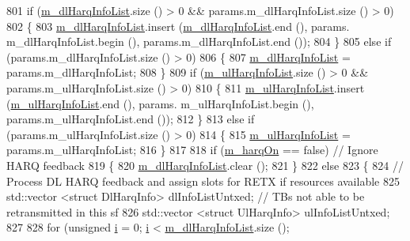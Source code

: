 \begin{DoxyCode}
801         \textcolor{keywordflow}{if} (\hyperlink{classns3_1_1MmWaveFlexTtiMaxWeightMacScheduler_afcc7ec068937dbf27338c5ed6a7a2f77}{m\_dlHarqInfoList}.size () > 0 && params.m\_dlHarqInfoList.size () > 0)
802         \{
803                 \hyperlink{classns3_1_1MmWaveFlexTtiMaxWeightMacScheduler_afcc7ec068937dbf27338c5ed6a7a2f77}{m\_dlHarqInfoList}.insert (\hyperlink{classns3_1_1MmWaveFlexTtiMaxWeightMacScheduler_afcc7ec068937dbf27338c5ed6a7a2f77}{m\_dlHarqInfoList}.end (), params.
      m\_dlHarqInfoList.begin (), params.m\_dlHarqInfoList.end ());
804         \}
805         \textcolor{keywordflow}{else} \textcolor{keywordflow}{if} (params.m\_dlHarqInfoList.size () > 0)
806         \{
807                 \hyperlink{classns3_1_1MmWaveFlexTtiMaxWeightMacScheduler_afcc7ec068937dbf27338c5ed6a7a2f77}{m\_dlHarqInfoList} = params.m\_dlHarqInfoList;
808         \}
809         \textcolor{keywordflow}{if} (\hyperlink{classns3_1_1MmWaveFlexTtiMaxWeightMacScheduler_ad0c6ce6c255be4838fe693c7c1934598}{m\_ulHarqInfoList}.size () > 0 && params.m\_ulHarqInfoList.size () > 0)
810         \{
811                 \hyperlink{classns3_1_1MmWaveFlexTtiMaxWeightMacScheduler_ad0c6ce6c255be4838fe693c7c1934598}{m\_ulHarqInfoList}.insert (\hyperlink{classns3_1_1MmWaveFlexTtiMaxWeightMacScheduler_ad0c6ce6c255be4838fe693c7c1934598}{m\_ulHarqInfoList}.end (), params.
      m\_ulHarqInfoList.begin (), params.m\_ulHarqInfoList.end ());
812         \}
813         \textcolor{keywordflow}{else} \textcolor{keywordflow}{if} (params.m\_ulHarqInfoList.size () > 0)
814         \{
815                 \hyperlink{classns3_1_1MmWaveFlexTtiMaxWeightMacScheduler_ad0c6ce6c255be4838fe693c7c1934598}{m\_ulHarqInfoList} = params.m\_ulHarqInfoList;
816         \}
817 
818         \textcolor{keywordflow}{if} (\hyperlink{classns3_1_1MmWaveFlexTtiMaxWeightMacScheduler_af63eec946bdf0fb2db0c66104e95f1a6}{m\_harqOn} == \textcolor{keyword}{false})          \textcolor{comment}{// Ignore HARQ feedback}
819         \{
820                 \hyperlink{classns3_1_1MmWaveFlexTtiMaxWeightMacScheduler_afcc7ec068937dbf27338c5ed6a7a2f77}{m\_dlHarqInfoList}.clear ();
821         \}
822         \textcolor{keywordflow}{else}
823         \{
824                 \textcolor{comment}{// Process DL HARQ feedback and assign slots for RETX if resources available}
825                 std::vector <struct DlHarqInfo> dlInfoListUntxed;  \textcolor{comment}{// TBs not able to be retransmitted in
       this sf}
826                 std::vector <struct UlHarqInfo> ulInfoListUntxed;
827 
828                 \textcolor{keywordflow}{for} (\textcolor{keywordtype}{unsigned} \hyperlink{bernuolliDistribution_8m_a6f6ccfcf58b31cb6412107d9d5281426}{i} = 0; \hyperlink{bernuolliDistribution_8m_a6f6ccfcf58b31cb6412107d9d5281426}{i} < \hyperlink{classns3_1_1MmWaveFlexTtiMaxWeightMacScheduler_afcc7ec068937dbf27338c5ed6a7a2f77}{m\_dlHarqInfoList}.size (); 

\end{DoxyCode}
